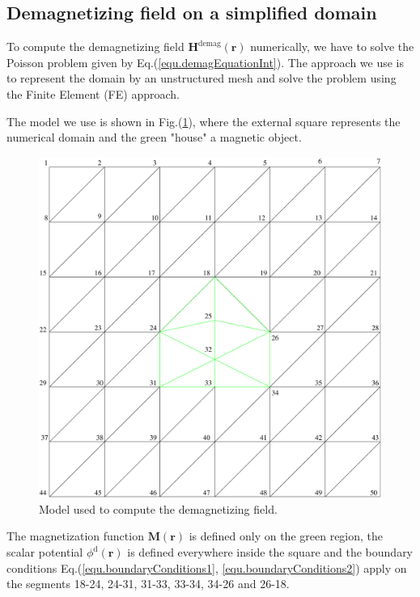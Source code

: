 \documentclass[11pt]{article}
\newcommand{\rv}[1]{\ensuremath{\mathbf{#1}}} %
\begin{document}
\subsection{Demagnetizing field on a simplified domain} 

To compute the demagnetizing field $\rv{H}^\mathrm{demag}
\rv{(r)}$ numerically, we have to solve the Poisson problem given by
Eq.(\ref{equ.demagEquationInt}). The approach we use is to represent
the domain by an unstructured mesh and solve the problem using the
Finite Element (FE) approach. 

The model we use is shown in Fig.(\ref{fig.simpleModel}), where the
external square represents the numerical domain and the green "house" a
magnetic object. 

\begin{figure}[htb] 
  \begin{center}
    \includegraphics[clip=true, width=1\textwidth]{house} 
  \end{center}
  \caption[]{Model used to compute the demagnetizing field.} 
  \label{fig.simpleModel} 
\end{figure}
The magnetization function $\rv{M(r)}$ is defined only on the green
region, the scalar potential $\phi^\mathrm{d}\rv{(r)}$ is
defined everywhere inside the square and the boundary conditions
Eq.(\ref{equ.boundaryConditions1}, \ref{equ.boundaryConditions2})
apply on the segments 18-24, 24-31, 31-33, 33-34, 34-26 and 26-18.  
\end{document}
